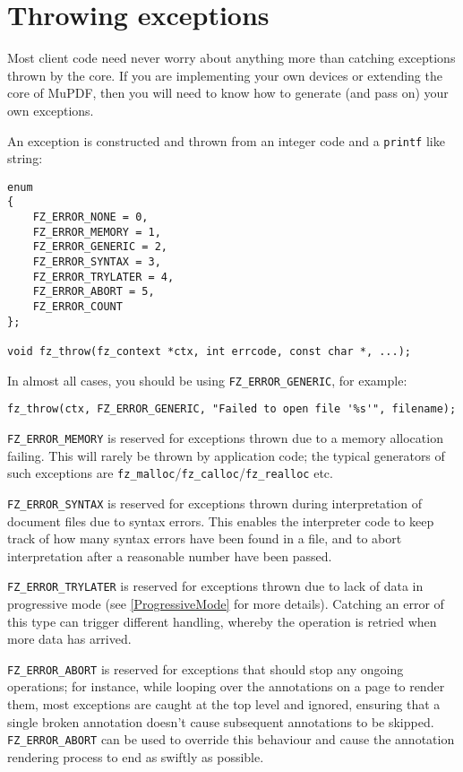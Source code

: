 \documentclass[oneside]{book}
\newcommand{\rjwref}[1] {\autoref{#1} \nameref{#1}}
\begin{document}
\section{Throwing exceptions}
\label{ThrowingExceptions}

Most client code need never worry about anything more than catching exceptions thrown by the core. If you are implementing your own devices or extending the core of MuPDF, then you will need to know how to generate (and pass on) your own exceptions.

An exception is constructed and thrown from an integer code and a \texttt{printf} like string:

\begin{lstlisting}
enum
{
	FZ_ERROR_NONE = 0,
	FZ_ERROR_MEMORY = 1,
	FZ_ERROR_GENERIC = 2,
	FZ_ERROR_SYNTAX = 3,
	FZ_ERROR_TRYLATER = 4,
	FZ_ERROR_ABORT = 5,
	FZ_ERROR_COUNT
};

void fz_throw(fz_context *ctx, int errcode, const char *, ...);
\end{lstlisting}

In almost all cases, you should be using \texttt{FZ\_ERROR\_GENERIC}, for example:

\begin{lstlisting}
fz_throw(ctx, FZ_ERROR_GENERIC, "Failed to open file '%s'", filename);
\end{lstlisting}

\texttt{FZ\_ERROR\_MEMORY} is reserved for exceptions thrown due to a memory allocation failing. This will rarely be thrown by application code; the typical generators of such exceptions are \texttt{fz\_malloc}\slash\texttt{fz\_calloc}\slash\texttt{fz\_realloc} etc.

\texttt{FZ\_ERROR\_SYNTAX} is reserved for exceptions thrown during interpretation of document files due to syntax errors. This enables the interpreter code to keep track of how many syntax errors have been found in a file, and to abort interpretation after a reasonable number have been passed.

\texttt{FZ\_ERROR\_TRYLATER} is reserved for exceptions thrown due to lack of data in progressive mode (see \rjwref{ProgressiveMode} for more details). Catching an error of this type can trigger different handling, whereby the operation is retried when more data has arrived.

\texttt{FZ\_ERROR\_ABORT} is reserved for exceptions that should stop any ongoing operations; for instance, while looping over the annotations on a page to render them, most exceptions are caught at the top level and ignored, ensuring that a single broken annotation doesn't cause subsequent annotations to be skipped. \texttt{FZ\_ERROR\_ABORT} can be used to override this behaviour and cause the annotation rendering process to end as swiftly as possible.
\end{document}
